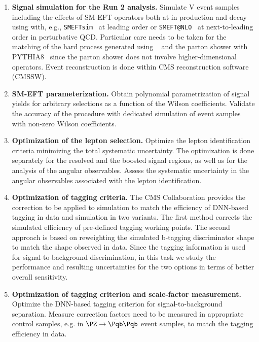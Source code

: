 \documentclass[a4paper,11pt]{article}
\newcommand{\Pb}{{{\Pqb}}\xspace}
\renewcommand{\PV}{{{{V}}}\xspace}
\newcommand{\VH}{{{\PV}{\PH}}\xspace}
\begin{document}
\begin{enumerate}[noitemsep,topsep=0pt]
\item {\bf Signal simulation for the Run 2 analysis.} Simulate \VH event samples including the effects of SM-EFT operators both at in production and decay using with, e.g., \texttt{SMEFTsim}~\cite{Brivio:2020onw} at leading order or \texttt{SMEFT@NLO}~\cite{Degrande:2020evl} at next-to-leading order in perturbative QCD. 
Particular care needs to be taken for the matching of the hard process generated using {\MGvATNLO}~\cite{Alwall:2014hca} and the parton shower with PYTHIA8~\cite{Sjostrand:2014zea} 
since the parton shower does not involve higher-dimensional operators. Event reconstruction is done within CMS reconstruction software (CMSSW).

\item {\bf SM-EFT parameterization.} Obtain polynomial parametrization of signal yields for arbitrary selections as a function of the Wilson coefficients. Validate the accuracy of the procedure with dedicated simulation of event samples with non-zero Wilson coefficients.

\item {\bf Optimization of the lepton selection.} Optimize the lepton identification criteria  minimizing the total systematic uncertainty. The optimization is done separately for the resolved and the boosted signal regions, as well as for the analysis of the angular observables.
Assess the systematic uncertainty in the angular observables associated with the lepton identification.

\item {\bf Optimization of \Pb tagging criteria.} 
The CMS Collaboration provides the correction to be applied to simulation to match the efficiency of DNN-based \Pb tagging in data and simulation in two variants. 
The first method corrects the simulated efficiency of pre-defined  \Pb tagging working points. 
The second approach is based on reweighting the simulated b-tagging discriminator shape to match the shape observed in data.
Since the \Pb tagging information is used for signal-to-background discrimination, in this task we study the performance and resulting uncertainties for the two options in terms of better overall sensitivity.

\item {\bf Optimization of \PH tagging criterion and scale-factor measurement.} Optimize the DNN-based \PH tagging criterion for signal-to-background separation. 
Measure correction factors need to be measured in appropriate control samples, e.g. in $\PZ\rightarrow\bar \Pqb\Pqb$ event samples, to match the tagging efficiency in data.


\end{enumerate}
\end{document}
